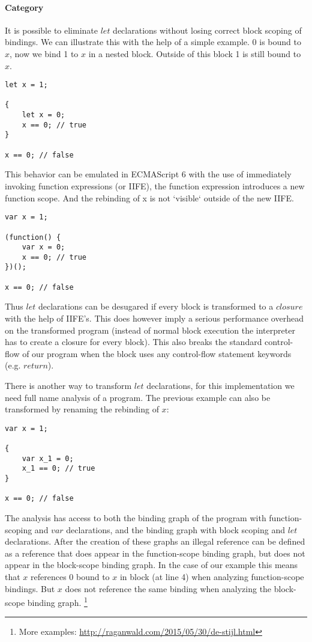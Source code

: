 \paragraph{Category}
It is possible to eliminate $let$ declarations without losing correct block scoping of bindings. We can illustrate this with the help of a simple example. 0 is bound to $x$, now we bind 1 to $x$ in a nested block. Outside of this block 1 is still bound to $x$.

\begin{lstlisting}
let x = 1;

{
	let x = 0;
	x == 0; // true
}

x == 0; // false
\end{lstlisting}

This behavior can be emulated in ECMAScript 6 with the use of immediately invoking function expressions (or IIFE), the function expression introduces a new function scope. And the rebinding of x is not `visible` outside of the new IIFE.

\begin{lstlisting}
var x = 1;

(function() {
	var x = 0;
	x == 0; // true
})();

x == 0; // false
\end{lstlisting}

Thus $let$ declarations can be desugared if every block is transformed to a $closure$ with the help of IIFE's. This does however imply a serious performance overhead on the transformed program (instead of normal block execution the interpreter has to create a closure for every block). This also breaks the standard control-flow of our program when the block uses any control-flow statement keywords (e.g. $return$). 

There is another way to transform $let$ declarations, for this implementation we need full name analysis of a program. The previous example can also be transformed by renaming the rebinding of $x$:

\begin{lstlisting}
var x = 1;

{
	var x_1 = 0;
	x_1 == 0; // true
}

x == 0; // false
\end{lstlisting}

The analysis has access to both the binding graph of the program with function-scoping and $var$ declarations, and the binding graph with block scoping and $let$ declarations. After the creation of these graphs an illegal reference can be defined as a reference that does appear in the function-scope binding graph, but does not appear in the block-scope binding graph. In the case of our example this means that $x$ references 0 bound to $x$ in block (at line 4) when analyzing function-scope bindings. But $x$ does not reference the same binding when analyzing the block-scope binding graph. \footnote{More examples: \url{http://raganwald.com/2015/05/30/de-stijl.html}}

